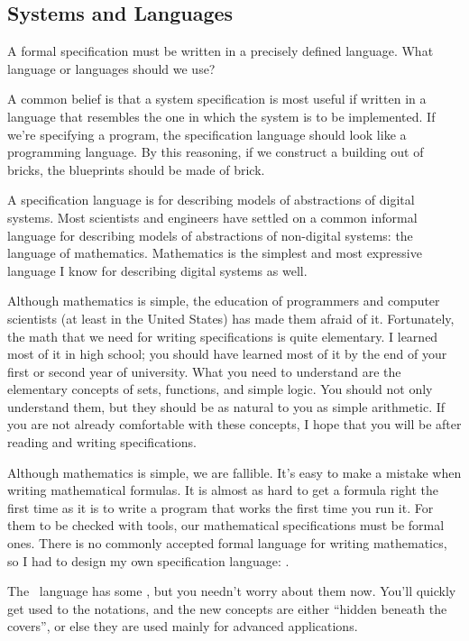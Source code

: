 
\subsection{Systems and Languages}

A formal specification must be written in a precisely defined
language.  What language or languages should we use?

A common belief is that a system specification is most useful if 
written in a language that resembles the one in which the system is to
be implemented.  If we're specifying a program, the specification
language should look like a programming language.  By this reasoning,
if we construct a building out of bricks, the blueprints should be
made of brick.

A specification language is for describing models of abstractions of
digital systems.  Most scientists and engineers have settled on a
common informal language for describing models of abstractions of
non-digital systems: the language of mathematics.  Mathematics is the
simplest and most expressive language I know for describing digital
systems as well.  

Although mathematics is simple, the education of programmers and
computer scientists (at least in the United States) has made them
afraid of it.  Fortunately, the math that we need for writing
specifications is quite elementary.  I learned most of it in high
school; you should have learned most of it by the end of your first or
second year of university.  What you need to understand are the
elementary concepts of sets, functions, and simple logic.  You should
not only understand them, but they should be as natural to you as
simple arithmetic.  If you are not already comfortable with these
concepts, I hope that you will be after reading and writing
specifications.

Although mathematics is simple, we are fallible.  It's easy to make a
mistake when writing mathematical formulas.  It is almost as hard to
get a formula right the first time as it is to write a program that
works the first time you run it.  For them to be checked with tools,
our mathematical specifications must be formal ones.  There is no
commonly accepted formal language for writing mathematics, so I had to
design my own specification language: \tlaplus.

The \tlaplus\ language has some 
, but you needn't worry about them now.  You'll quickly get used
to the notations, and the new concepts are either ``hidden beneath the
covers'', or else they are used mainly for advanced applications.

